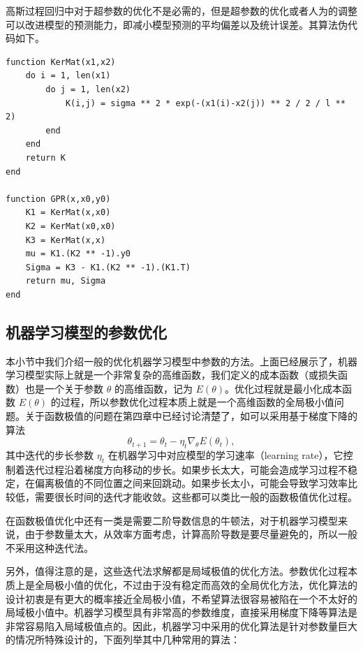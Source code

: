 高斯过程回归中对于超参数的优化不是必需的，但是超参数的优化或者人为的调整可以改进模型的预测能力，即减小模型预测的平均偏差以及统计误差。其算法伪代码如下。

\begin{algorithmBox}
\begin{lstlisting}[style=bellacode]
function KerMat(x1,x2)
    do i = 1, len(x1)
        do j = 1, len(x2)
            K(i,j) = sigma ** 2 * exp(-(x1(i)-x2(j)) ** 2 / 2 / l ** 2)
        end
    end
    return K
end

function GPR(x,x0,y0)
    K1 = KerMat(x,x0)
    K2 = KerMat(x0,x0)
    K3 = KerMat(x,x)
    mu = K1.(K2 ** -1).y0
    Sigma = K3 - K1.(K2 ** -1).(K1.T)
    return mu, Sigma
end
\end{lstlisting}
\end{algorithmBox}

\subsection{机器学习模型的参数优化}
本小节中我们介绍一般的优化机器学习模型中参数的方法。上面已经展示了，机器学习模型实际上就是一个非常复杂的高维函数，我们定义的成本函数（或损失函数）也是一个关于参数 $\theta$ 的高维函数，记为 $E(\theta)$。优化过程就是最小化成本函数 $E(\theta)$ 的过程，所以参数优化过程本质上就是一个高维函数的全局极小值问题。关于函数极值的问题在第四章中已经讨论清楚了，如可以采用基于梯度下降的算法
\begin{equation}
\theta_{t+1}=\theta_t-\eta_t\nabla_\theta E(\theta_t),
\tag{8.1.20}
\end{equation}
其中迭代的步长参数 $\eta_t$ 在机器学习中对应模型的学习速率（learning rate），它控制着迭代过程沿着梯度方向移动的步长。如果步长太大，可能会造成学习过程不稳定，在偏离极值的不同位置之间来回跳动。如果步长太小，可能会导致学习效率比较低，需要很长时间的迭代才能收敛。这些都可以类比一般的函数极值优化过程。

在函数极值优化中还有一类是需要二阶导数信息的牛顿法，对于机器学习模型来说，由于参数量太大，从效率方面考虑，计算高阶导数是要尽量避免的，所以一般不采用这种迭代法。

另外，值得注意的是，这些迭代法求解都是局域极值的优化方法。参数优化过程本质上是全局极小值的优化，不过由于没有稳定而高效的全局优化方法，优化算法的设计初衷是有更大的概率接近全局极小值，不希望算法很容易被陷在一个不太好的局域极小值中。机器学习模型具有非常高的参数维度，直接采用梯度下降等算法是非常容易陷入局域极值点的。因此，机器学习中采用的优化算法是针对参数量巨大的情况所特殊设计的，下面列举其中几种常用的算法：

